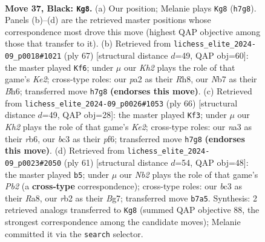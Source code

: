 \documentclass[11pt]{article}
\begin{document}
\clearpage

\begin{figure}[p]\centering
\begin{subfigure}{0.46\textwidth}\centering
\resizebox{\linewidth}{!}{%
\newchessgame
\chessboard[
  setfen={r1r5/pn3p1k/1p2p1pp/8/2P5/N1B1P2P/PR2KPP1/7R b - - 4 37},
  showmover=false,
  pgfstyle=straightmove, color=movearrow, markmove={h7-g8}
]}
\caption{}
\end{subfigure}\hfill
\begin{subfigure}{0.46\textwidth}\centering
\resizebox{\linewidth}{!}{%
\newchessgame
\chessboard[
  setfen={7r/4kp2/3p3b/p1r1pB2/1p6/5P1P/PPP5/1K2R1R1 b - - 4 34},
  showmover=false,
  pgfstyle=straightmove, color=movearrow, markmove={e7-f6}
]}
\caption{}
\end{subfigure}
\\[4pt]
\begin{subfigure}{0.46\textwidth}\centering
\resizebox{\linewidth}{!}{%
\newchessgame
\chessboard[
  setfen={8/p1rk1p2/1rp1pp1p/8/2RP4/4P2P/P1R1KPP1/8 w - - 17 34},
  showmover=false,
  pgfstyle=straightmove, color=movearrow, markmove={e2-f3}
]}
\caption{}
\end{subfigure}\hfill
\begin{subfigure}{0.46\textwidth}\centering
\resizebox{\linewidth}{!}{%
\newchessgame
\chessboard[
  setfen={r3r1k1/1p4b1/p5pp/n3P3/P1p1R3/2Pp2BP/RP1N2P1/6K1 b - - 0 31},
  showmover=false,
  pgfstyle=straightmove, color=movearrow, markmove={b7-b5}
]}
\caption{}
\end{subfigure}
\caption{\textbf{Move 37, Black: \texttt{Kg8}.} (a) Our position; Melanie plays \texttt{Kg8} (\texttt{h7g8}). Panels (b)--(d) are the retrieved master positions whose correspondence most drove this move (highest QAP objective among those that transfer to it). (b) Retrieved from \texttt{lichess\_elite\_2024-09\_p0018\#1021} (ply 67) [structural distance $d$=49, QAP obj=60]: the master played \texttt{Kf6}; under $\mu$ our \emph{Kh2} plays the role of that game's \emph{Ke2}; cross-type roles: our \emph{p}a2 as their \emph{R}h8, our \emph{N}b7 as their \emph{B}h6; transferred move \texttt{h7g8} \textbf{(endorses this move)}. (c) Retrieved from \texttt{lichess\_elite\_2024-09\_p0026\#1053} (ply 66) [structural distance $d$=49, QAP obj=28]: the master played \texttt{Kf3}; under $\mu$ our \emph{Kh2} plays the role of that game's \emph{Ke2}; cross-type roles: our \emph{n}a3 as their \emph{r}b6, our \emph{b}c3 as their \emph{p}f6; transferred move \texttt{h7g8} \textbf{(endorses this move)}. (d) Retrieved from \texttt{lichess\_elite\_2024-09\_p0023\#2050} (ply 61) [structural distance $d$=54, QAP obj=48]: the master played \texttt{b5}; under $\mu$ our \emph{Nb2} plays the role of that game's \emph{Pb2} (a \textbf{cross-type} correspondence); cross-type roles: our \emph{b}c3 as their \emph{R}a8, our \emph{r}b2 as their \emph{B}g7; transferred move \texttt{b7a5}. Synthesis: 2 retrieved analogs transferred to \texttt{Kg8} (summed QAP objective 88, the strongest correspondence among the candidate moves); Melanie committed it via the \texttt{search} selector.}
\label{fig:thought-m73}
\end{figure}
\end{document}
